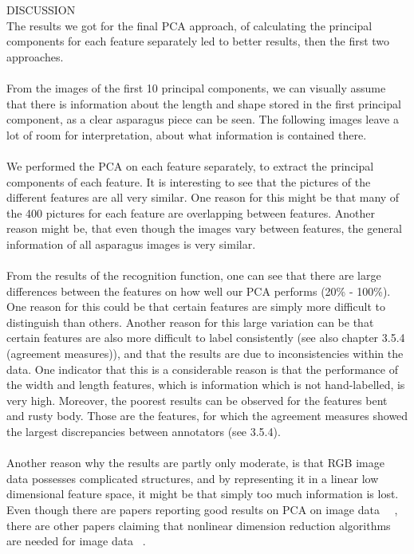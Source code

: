 DISCUSSION \\
The results we got for the final PCA approach, of calculating the principal components for each feature separately led to better results, then the first two approaches.  \\
 \\
From the images of the first 10 principal components, we can visually assume that there is information about the length and shape stored in the first principal component, as a clear asparagus piece can be seen. The following images leave a lot of room for interpretation, about what information is contained there.  \\
\\
We performed the PCA on each feature separately, to extract the principal components of each feature. It is interesting to see that the pictures of the different features are all very similar. One reason for this might be that many of the 400 pictures for each feature are overlapping between features. Another reason might be, that even though the images vary between features, the general information of all asparagus images is very similar. \\
\\
From the results of the recognition function, one can see that there are large differences between the features on how well our PCA performs (20\% - 100\%). 
One reason for this could be that certain features are simply more difficult to distinguish than others. Another reason for this large variation can be that certain features are also more difficult to label consistently (see also chapter 3.5.4  (agreement measures)), and that the results are due to inconsistencies within the data. One indicator that this is a considerable reason is that the performance of the width and length features, which is information which is not hand-labelled, is very high. Moreover, the poorest results can be observed for the features bent and rusty body. Those are the features, for which the agreement measures showed the largest discrepancies between annotators (see 3.5.4).  \\
 \\
Another reason why the results are partly only moderate, is that RGB image data possesses complicated structures, and by representing it in a linear low dimensional feature space, it might be that simply too much information is lost. Even though there are papers reporting good results on PCA on image data~\citep{turk1991face} ~\citep{lata2009}, there are other papers claiming that nonlinear dimension reduction algorithms are needed for image data ~\citep{olaode2014}.



